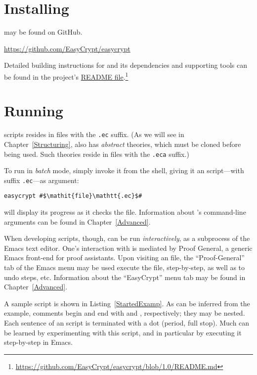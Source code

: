 \section{Installing \EasyCrypt}

\EasyCrypt may be found on GitHub.
\begin{center}
\url{https://github.com/EasyCrypt/easycrypt}
\end{center}
Detailed building instructions for \EasyCrypt and its dependencies and
supporting tools can be found in the project's
\href{https://github.com/EasyCrypt/easycrypt/blob/1.0/README.md}{README
  file}.\footnote{\url{https://github.com/EasyCrypt/easycrypt/blob/1.0/README.md}}

\section{Running \EasyCrypt}

\EasyCrypt scripts resides in files with the \texttt{.ec} suffix. (As
we will see in Chapter~\ref{Structuring}, \EasyCrypt also has
\emph{abstract} theories, which must be cloned before being used. Such
theories reside in files with the \texttt{.eca} suffix.)

To run \EasyCrypt in \emph{batch} mode, simply invoke it from the
shell, giving it an \EasyCrypt script---with suffix \texttt{.ec}---as
argument:
\begin{lstlisting}
easycrypt #$\mathit{file}\mathtt{.ec}$#
\end{lstlisting}
\EasyCrypt will display its progress as it checks the file.
Information about \EasyCrypt's command-line arguments can be found in
Chapter~\ref{Advanced}.

When developing \EasyCrypt scripts, though, \EasyCrypt can be run
\emph{interactively}, as a subprocess of the Emacs text editor. One's
interaction with \EasyCrypt is mediated by Proof General, a generic
Emacs front-end for proof assistants.  Upon visiting an \EasyCrypt
file, the ``Proof-General'' tab of the Emacs menu may be used execute
the file, step-by-step, as well as to undo steps, etc. Information
about the ``EasyCrypt'' menu tab may be found in
Chapter~\ref{Advanced}.

A sample \EasyCrypt script is shown in Listing~\ref{StartedExamp}.
As can be inferred from the example, comments begin and end with
\ec{(*} and \ec{*)}, respectively; they may be nested. Each sentence
of an \EasyCrypt script is terminated with a dot (period, full stop).
Much can be learned by experimenting with this script, and in
particular by executing it step-by-step in Emacs.

